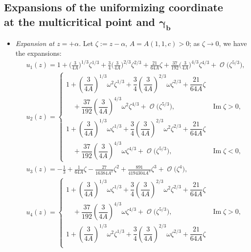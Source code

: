 \documentclass[10pt,a4paper]{amsart}
\DeclareMathOperator{\OO}{\mathcal{O}}
\numberwithin{equation}{section}
\begin{document}
\subsection[Expansions of the uniformizing coordinate at the multicritical point and $\gamma_b$]{Expansions of the uniformizing coordinate\\ at the multicritical point and $\boldsymbol{\gamma_b}$}
\begin{itemize}\itemsep=0pt
 \item \textit{Expansion at $z= +\alpha$}. Let $\zeta:=z-\alpha$, $A = A(1,1,c)>0$; as $\zeta\to 0$, we have the expansions:
 \begin{align*}
 &u_1(z) = 1+ \biggl(\frac{3}{4A}\biggr)^{1/3}\!\zeta^{1/3} + \frac{3}{4}\biggl(\frac{3}{4A}\biggr)^{2/3}\!\zeta^{2/3} + \frac{21}{64A}\!\zeta + \frac{37}{192}\biggl(\frac{3}{4A}\biggr)^{4/3}\zeta^{4/3} + \OO\bigl(\zeta^{5/3}\bigr),\\
 &u_2(z) =
 \begin{cases}
 1+ \left(\dfrac{3}{4A}\right)^{1/3}\omega^2\zeta^{1/3} + \dfrac{3}{4}\left(\dfrac{3}{4A}\right)^{2/3}\omega\zeta^{2/3} + \dfrac{21}{64A}\zeta&\\
 \quad{}+ \dfrac{37}{192}\left(\dfrac{3}{4A}\right)^{4/3}\omega^2\zeta^{4/3} + \OO\bigl(\zeta^{5/3}\bigr),
 & \operatorname{Im}\zeta >0,\\[1mm]
 1+ \left(\dfrac{3}{4A}\right)^{1/3}\omega\zeta^{1/3} + \dfrac{3}{4}\left(\dfrac{3}{4A}\right)^{2/3}\omega^2\zeta^{2/3} + \dfrac{21}{64A}\zeta&\\
 \quad{}+ \dfrac{37}{192}\left(\dfrac{3}{4A}\right)^{4/3}\omega\zeta^{4/3} + \OO\bigl(\zeta^{5/3}\bigr), & \operatorname{Im}\zeta <0,
 \end{cases}\\
 &u_3(z) =-\frac{1}{3} + \frac{1}{64A}\zeta - \frac{27}{16384A^2}\zeta^2 + \frac{891}{4194304A^3}\zeta^3 + \OO\bigl(\zeta^4\bigr),\\
 &u_4(z) =
 \begin{cases}
 1+ \left(\dfrac{3}{4A}\right)^{1/3}\omega\zeta^{1/3} + \dfrac{3}{4}\left(\dfrac{3}{4A}\right)^{2/3}\omega^2\zeta^{2/3}+ \dfrac{21}{64A}\zeta&\\
 \quad{}+ \dfrac{37}{192}\left(\dfrac{3}{4A}\right)^{4/3}\omega\zeta^{4/3} + \OO\bigl(\zeta^{5/3}\bigr), & \operatorname{Im}\zeta >0,\\[0.8mm]
 1+ \left(\dfrac{3}{4A}\right)^{1/3}\omega^2\zeta^{1/3} + \dfrac{3}{4}\left(\dfrac{3}{4A}\right)^{2/3}\omega\zeta^{2/3}+ \dfrac{21}{64A}\zeta&\\

\end{cases}
\end{align*}
\end{itemize}
\end{document}
